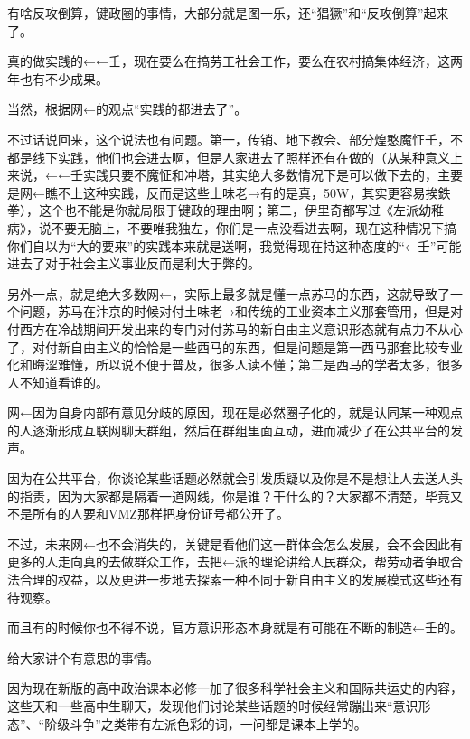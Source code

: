 \begin{zhihuanswer}
有啥反攻倒算，键政圈的事情，大部分就是图一乐，还``猖獗''和``反攻倒算''起来了。

真的做实践的←←壬，现在要么在搞劳工社会工作，要么在农村搞集体经济，这两年也有不少成果。

当然，根据网←的观点``实践的都进去了''。

不过话说回来，这个说法也有问题。第一，传销、地下教会、部分煌憨魔怔壬，不都是线下实践，他们也会进去啊，但是人家进去了照样还有在做的（从某种意义上来说，←←壬实践只要不魔怔和冲塔，其实绝大多数情况下是可以做下去的，主要是网←瞧不上这种实践，反而是这些土味老→有的是真，50W，其实更容易挨鉄拳），这个也不能是你就局限于键政的理由啊；第二，伊里奇都写过《左派幼稚病》，说不要无脑上，不要唯我独左，你们是一点没看进去啊，现在这种情况下搞你们自以为``大的要来''的实践本来就是送啊，我觉得现在持这种态度的``←壬''可能进去了对于社会主义事业反而是利大于弊的。

另外一点，就是绝大多数网←，实际上最多就是懂一点苏马的东西，这就导致了一个问题，苏马在汴京的时候对付土味老→和传统的工业资本主义那套管用，但是对付西方在冷战期间开发出来的专门对付苏马的新自由主义意识形态就有点力不从心了，对付新自由主义的恰恰是一些西马的东西，但是问题是第一西马那套比较专业化和晦涩难懂，所以说不便于普及，很多人读不懂；第二是西马的学者太多，很多人不知道看谁的。

网←因为自身内部有意见分歧的原因，现在是必然圈子化的，就是认同某一种观点的人逐渐形成互联网聊天群组，然后在群组里面互动，进而减少了在公共平台的发声。

因为在公共平台，你谈论某些话题必然就会引发质疑以及你是不是想让人去送人头的指责，因为大家都是隔着一道网线，你是谁？干什么的？大家都不清楚，毕竟又不是所有的人要和VMZ那样把身份证号都公开了。

不过，未来网←也不会消失的，关键是看他们这一群体会怎么发展，会不会因此有更多的人走向真的去做群众工作，去把←派的理论讲给人民群众，帮劳动者争取合法合理的权益，以及更进一步地去探索一种不同于新自由主义的发展模式这些还有待观察。

而且有的时候你也不得不说，官方意识形态本身就是有可能在不断的制造←壬的。

给大家讲个有意思的事情。

因为现在新版的高中政治课本必修一加了很多科学社会主义和国际共运史的内容，这些天和一些高中生聊天，发现他们讨论某些话题的时候经常蹦出来``意识形态''、``阶级斗争''之类带有左派色彩的词，一问都是课本上学的。
\end{zhihuanswer}
